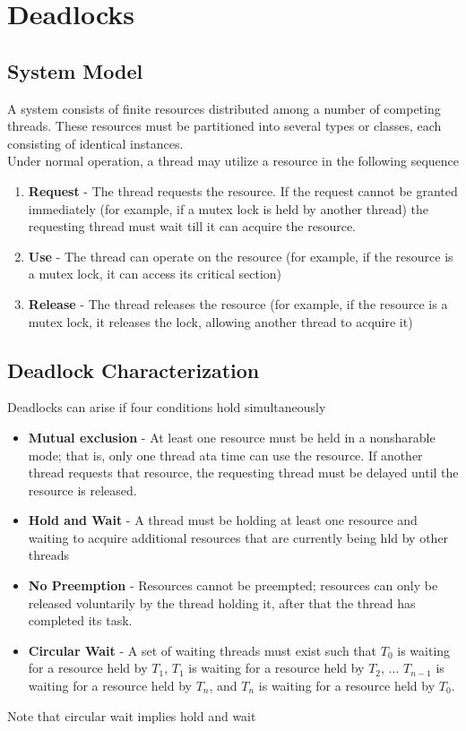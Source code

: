 \documentclass{book/custombook}
\begin{document}
    \chapter{Deadlocks}
        \section{System Model}
            A system consists of finite resources distributed among a number of competing threads.
            These resources must be partitioned into several types or classes, each consisting of identical
            instances.\\
            Under normal operation, a thread may utilize a resource in the following sequence
            \begin{enumerate}
                \item \textbf{Request} - The thread requests the resource. If the request cannot be granted 
                immediately (for example, if a mutex lock is held by another thread) the requesting thread must
                wait till it can acquire the resource.
                \item \textbf{Use} - The thread can operate on the resource (for example, if the resource is a mutex
                lock, it can access its critical section)
                \item \textbf{Release} - The thread releases the resource (for example, if the resource is a mutex
                lock, it releases the lock, allowing another thread to acquire it)
            \end{enumerate}
        \section{Deadlock Characterization}
            Deadlocks can arise if four conditions hold simultaneously
            \begin{itemize}
                \item \textbf{Mutual exclusion} - At least one resource must be held in a nonsharable mode;
                that is, only one thread ata time can use the resource. If another thread requests that resource, 
                the requesting thread must be delayed until the resource is released.
                \item \textbf{Hold and Wait} - A thread must be holding at least one resource and waiting to acquire
                additional resources that are currently being hld by other threads
                \item \textbf{No Preemption} - Resources cannot be preempted; resources can only be released voluntarily
                by the thread holding it, after that the thread has completed its task.
                \item \textbf{Circular Wait} - A set of waiting threads must exist such that $T_0$ is waiting for a 
                resource held by $T_1$, $T_1$ is waiting for a resource held by $T_2$, ... $T_{n-1}$ is waiting for a 
                resource held by $T_n$, and $T_n$ is waiting for a resource held by $T_0$.
            \end{itemize}
            Note that circular wait implies hold and wait
\end{document}
